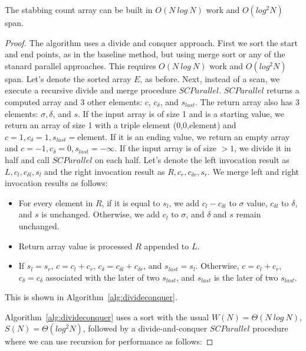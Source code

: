 \begin{lemma}
The stabbing count array can be built in $O(N~log~N)$ work and
$O(log^2 N)$ span.
\end{lemma}

\begin{proof}
The algorithm uses a divide and conquer approach.  First we sort the
start and end points, as in the baseline method, but using merge sort
or any of the stanard parallel approaches.  This requires $O(N~log~N)$
work and $O(log^2 N)$ span.  Let's denote the sorted array $E$, as
before.  Next, instead of a scan, we execute a recursive divide and
merge procedure $SCParallel$.  $SCParallel$ returns a computed array
and 3 other elements: $c$, $c_{\delta}$, and $s_{last}$.  The return
array also has 3 elements: $\sigma, \delta$, and $s$.  If the input
array is of size 1 and is a starting value, we return an array of size
1 with a triple element (0,0,element) and $c=1, c_{\delta}=1,
s_{last}=$element.  If it is an ending value, we return an empty array
and $c=-1, c_{\delta}=0, s_{last}=-\infty$.  If the input array is of
size $>1$, we divide it in half and call $SCParallel$ on each half.
Let's denote the left invocation result as $L, c_l, c_{\delta l}, s_l$
and the right invocation result as $R, c_r, c_{\delta r}, s_r$.  We
merge left and right invocation results as follows: 

\begin{itemize}
\item For every element in $R$, if it is equal to $s_l$, we add
  $c_l-c_{\delta l}$ to $\sigma$ value, $c_{\delta l}$ to $\delta$,
  and $s$ is unchanged.  Otherwise, we add $c_l$ to $\sigma$, and
  $\delta$ and $s$ remain unchanged.
\item Return array value is processed $R$ appended to $L$.
\item If $s_l=s_r$, $c=c_l + c_r$, $c_{\delta} =
  c_{\delta l} + c_{\delta r}$, and $s_{last}=s_l$.  Otherwise,
  $c=c_l + c_r$, $c_{\delta}=c_{\delta}$ associated with the later of
  two $s_{last}$, and $s_{last}$ is the later of two $s_{last}$.
\end{itemize}

This is shown in Algorithm~\ref{alg:divideconquer}.


Algorithm~\ref{alg:divideconquer} uses a sort with the usual $W(N) =
\Theta(N~log~N)$, $S(N) = \Theta(log^2 N)$, followed by a
divide-and-conquer $SCParallel$ procedure where we can use
recursion for performance as follows:


\end{proof}
